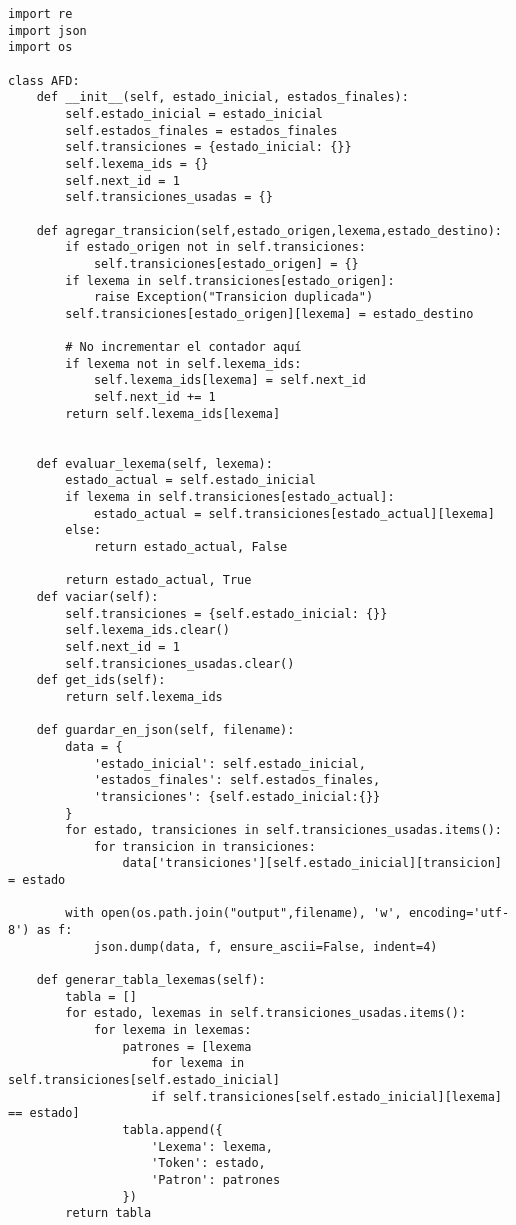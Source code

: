 \documentclass[12pt,a4paper]{article}
\begin{document}
\begin{verbatim}
import re
import json
import os

class AFD:
    def __init__(self, estado_inicial, estados_finales):
        self.estado_inicial = estado_inicial
        self.estados_finales = estados_finales
        self.transiciones = {estado_inicial: {}}
        self.lexema_ids = {}
        self.next_id = 1
        self.transiciones_usadas = {}  
        
    def agregar_transicion(self,estado_origen,lexema,estado_destino):
        if estado_origen not in self.transiciones:
            self.transiciones[estado_origen] = {}
        if lexema in self.transiciones[estado_origen]:
            raise Exception("Transicion duplicada")
        self.transiciones[estado_origen][lexema] = estado_destino
        
        # No incrementar el contador aquí
        if lexema not in self.lexema_ids:
            self.lexema_ids[lexema] = self.next_id
            self.next_id += 1
        return self.lexema_ids[lexema]


    def evaluar_lexema(self, lexema):
        estado_actual = self.estado_inicial
        if lexema in self.transiciones[estado_actual]:
            estado_actual = self.transiciones[estado_actual][lexema]
        else:
            return estado_actual, False

        return estado_actual, True
    def vaciar(self):
        self.transiciones = {self.estado_inicial: {}}
        self.lexema_ids.clear()  
        self.next_id = 1
        self.transiciones_usadas.clear()    
    def get_ids(self):
        return self.lexema_ids

    def guardar_en_json(self, filename):
        data = {
            'estado_inicial': self.estado_inicial,
            'estados_finales': self.estados_finales,
            'transiciones': {self.estado_inicial:{}}
        }
        for estado, transiciones in self.transiciones_usadas.items():
            for transicion in transiciones:
                data['transiciones'][self.estado_inicial][transicion] = estado  
                                    
        with open(os.path.join("output",filename), 'w', encoding='utf-8') as f:
            json.dump(data, f, ensure_ascii=False, indent=4)
        
    def generar_tabla_lexemas(self):
        tabla = []
        for estado, lexemas in self.transiciones_usadas.items():
            for lexema in lexemas:
                patrones = [lexema 
                    for lexema in self.transiciones[self.estado_inicial] 
                    if self.transiciones[self.estado_inicial][lexema] == estado]
                tabla.append({
                    'Lexema': lexema,
                    'Token': estado,
                    'Patron': patrones
                })
        return tabla
\end{verbatim}
\end{document}
